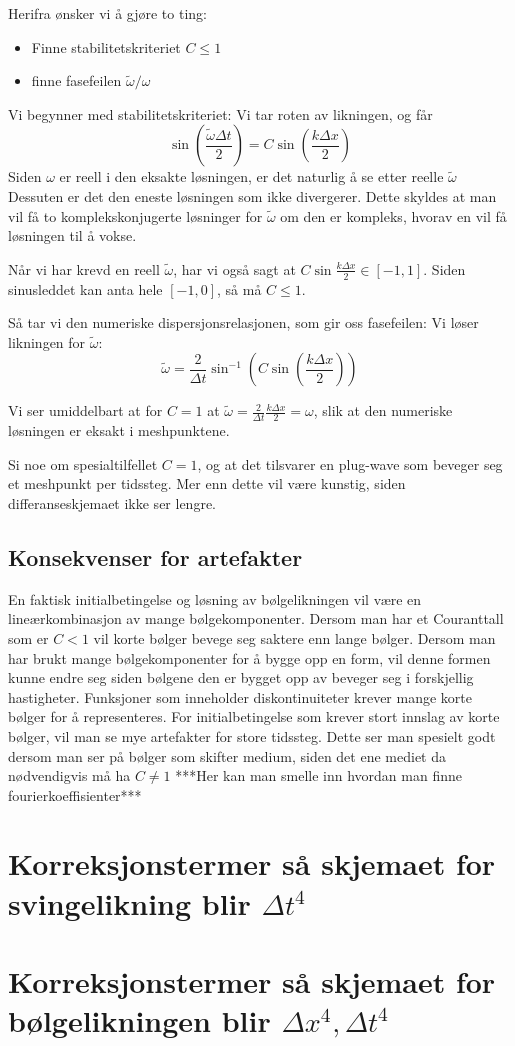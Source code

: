 \documentclass[a4paper, 10pt]{article}
\begin{document}
Herifra ønsker vi å gjøre to ting:
\begin{itemize}
\item Finne stabilitetskriteriet $C\leq 1$
\item finne fasefeilen $\tilde{\omega}/\omega$
\end{itemize}

Vi begynner med stabilitetskriteriet:
Vi tar roten av likningen, og får 
\begin{equation}
	\sin\left(\frac{\tilde\omega\Delta t}{2}\right)
= C\sin\left(\frac{k\Delta x}{2}\right)
\end{equation}
Siden $\omega$ er reell i den eksakte løsningen, er det naturlig å se etter reelle $\tilde{\omega}$ Dessuten er det den eneste løsningen som ikke divergerer. Dette skyldes at man vil få to komplekskonjugerte løsninger for $\tilde{\omega}$ om den er kompleks, hvorav en vil få løsningen til å vokse. 

Når vi har krevd en reell $\tilde{\omega}$, har vi også sagt at $C\sin{\frac{k\Delta x}{2}} \in [-1, 1]$. Siden sinusleddet kan anta hele $[-1, 0]$, så må $C\leq 1$.

Så tar vi den numeriske dispersjonsrelasjonen, som gir oss fasefeilen:
Vi løser likningen for $\tilde{\omega}$:
\begin{equation}
	\tilde\omega = \frac{2}{\Delta t}
\sin^{-1}\left( C\sin\left(\frac{k\Delta x}{2}\right)\right)
\end{equation}

Vi ser umiddelbart at for $C=1$ at $\tilde{\omega} = \frac{2}{\Delta t}\frac{k\Delta x}{2} = \omega$, slik at den numeriske løsningen er eksakt i meshpunktene. 


Si noe om spesialtilfellet $C=1$, og at det tilsvarer en plug-wave som beveger seg et meshpunkt per tidssteg. Mer enn dette vil være kunstig, siden differanseskjemaet ikke ser lengre. 

\subsection{Konsekvenser for artefakter}
En faktisk initialbetingelse og løsning av bølgelikningen vil være en lineærkombinasjon av mange bølgekomponenter. Dersom man har et Couranttall som er $C<1$ vil korte bølger bevege seg saktere enn lange bølger. Dersom man har brukt mange bølgekomponenter for å bygge opp en form, vil denne formen kunne endre seg siden bølgene den er bygget opp av beveger seg i forskjellig hastigheter. Funksjoner som inneholder diskontinuiteter krever mange korte bølger for å representeres. For initialbetingelse som krever stort innslag av korte bølger, vil man se mye artefakter for store tidssteg. Dette ser man spesielt godt dersom man ser på bølger som skifter medium, siden det ene mediet da nødvendigvis må ha $C \neq 1$
***Her kan man smelle inn hvordan man finne fourierkoeffisienter***


\section{Korreksjonstermer så skjemaet for svingelikning blir $\Delta t^4$}

\section{Korreksjonstermer så skjemaet for bølgelikningen blir $\Delta x^4, \Delta t^4$}
\end{document}
